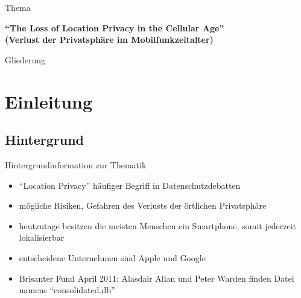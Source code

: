 





\begin{frame}[plain]
 \titlepage
\end{frame}

\begin{frame}{Thema}
\begin{center}
  \huge \textbf{"`The Loss of Location Privacy in the Cellular Age"'\\ \vspace{.5cm} (Verlust der Privatsphäre im Mobilfunkzeitalter)}
\end{center}
\end{frame}

\begin{frame}{Gliederung}
  \tableofcontents[hideallsubsections] %
\end{frame}

\section{Einleitung}
\subsection{Hintergrund}
\begin{frame}{Hintergrundinformation zur Thematik}
\begin{itemize}
  \item "`Location Privacy"' häufiger Begriff in Datenschutzdebatten
  \item mögliche Risiken, Gefahren des Verlusts der örtlichen Privatsphäre
  \item heutzutage besitzen die meisten Menschen ein Smartphone, somit jederzeit lokalisierbar
  \item entscheidene Unternehmen sind Apple und Google
  \item Brisanter Fund April 2011: Alasdair Allan und Peter Warden finden Datei namens "`consolidated.db"'
\end{itemize}
\end{frame}

